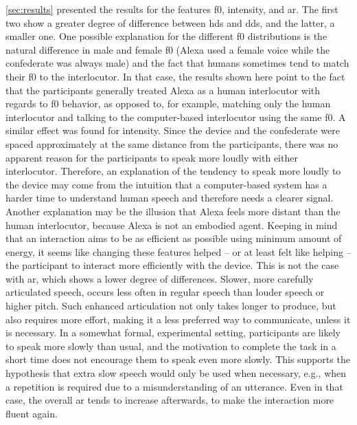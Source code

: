 \cref{sec:results} presented the results for the features \ac{f0}, intensity, and \acf{ar}.
The first two show a greater degree of difference between \ac{hds} and \ac{dds}, and the latter, a smaller one.
One possible explanation for the different \ac{f0} distributions is the natural difference in male and female \ac{f0} (Alexa used a female voice while the confederate was always male) and the fact that humans sometimes tend to match their \ac{f0} to the interlocutor.
In that case, the results shown here point to the fact that the participants generally treated Alexa as a human interlocutor with regards to \ac{f0} behavior, as opposed to, for example, matching only the human interlocutor and talking to the computer-based interlocutor using the same \ac{f0}.
A similar effect was found for intensity.
Since the device and the confederate were spaced approximately at the same distance from the participants, there was no apparent reason for the participants to speak more loudly with either interlocutor.
Therefore, an explanation of the tendency to speak more loudly to the device may come from the intuition that a computer-based system has a harder time to understand human speech and therefore needs a clearer signal.
Another explanation may be the illusion that Alexa feels more distant than the human interlocutor, because Alexa is not an embodied agent.
Keeping in mind that an interaction aims to be as efficient as possible using minimum amount of energy, it seems like changing these features helped -- or at least felt like helping -- the participant to interact more efficiently with the device.
This is not the case with \ac{ar}, which shows a lower degree of differences.
Slower, more carefully articulated speech, occurs less often in regular speech than louder speech or higher pitch.
Such enhanced articulation not only takes longer to produce, but also requires more effort, making it a less preferred way to communicate, unless it is necessary.
In a somewhat formal, experimental setting, participants are likely to speak more slowly than usual, and the motivation to complete the task in a short time does not encourage them to speak even more slowly.
This supports the hypothesis that extra slow speech would only be used when necessary, e.g., when a repetition is required due to a misunderstanding of an utterance.
Even in that case, the overall \ac{ar} tends to increase afterwards, to make the interaction more fluent again.

